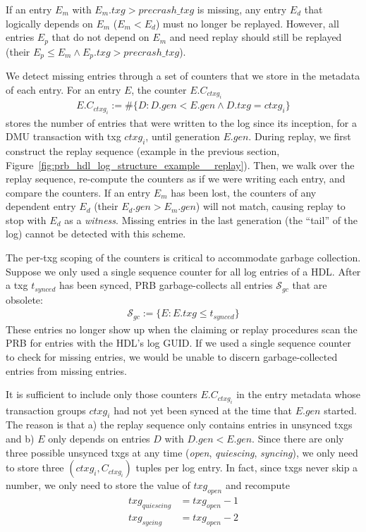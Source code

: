 \documentclass[12pt,a4paper,twoside]{book}
\begin{document}
If an entry $E_m$ with $E_m.txg > precrash\_txg$ is missing, any entry $E_d$ that logically depends on $E_m$ ($E_m < E_d$) must no longer be replayed.
However, all entries $E_p$ that do not depend on $E_m$ and need replay should still be replayed (their $E_p \le E_m \wedge E_p.txg > precrash\_txg$).

We detect missing entries through a set of counters that we store in the metadata of each entry.
For an entry $E$, the counter $E.C_{ctxg_i}$
\begin{gather*}
    E.C_{ctxg_i} := \#\{ D : D.gen < E.gen \wedge D.txg = ctxg_i\}
\end{gather*}
stores the number of entries that were written to the log since its inception, for a DMU transaction with txg $ctxg_i$, until generation $E.gen$.
During replay, we first construct the replay sequence (example in the previous section, Figure~\ref{fig:prb_hdl_log_structure_example__replay}).
Then, we walk over the replay sequence, re-compute the counters as if we were writing each entry, and compare the counters.
If an entry $E_m$ has been lost, the counters of any dependent entry $E_d$ (their $E_d.gen > E_m.gen$) will not match, causing replay to stop with $E_d$ as a \textit{witness}.
Missing entries in the last generation (the ``tail'' of the log) cannot be detected with this scheme.

The per-txg scoping of the counters is critical to accommodate garbage collection.
Suppose we only used a single sequence counter for all log entries of a HDL.
After a txg $t_{synced}$ has been synced, PRB garbage-collects all entries $\mathcal{S}_{gc}$ that are obsolete:
\begin{align*}
    \mathcal{S}_{gc} := \{ E : E.txg \le t_{synced}\}
\end{align*}
These entries no longer show up when the claiming or replay procedures scan the PRB for entries with the HDL's log GUID.
If we used a single sequence counter to check for missing entries, we would be unable to discern garbage-collected entries from missing entries.

It is sufficient to include only those counters $E.C_{ctxg_i}$ in the entry metadata whose transaction groups $ctxg_i$ had not yet been synced at the time that $E.gen$ started.
The reason is that a) the replay sequence only contains entries in unsynced txgs and b) $E$ only depends on entries $D$ with $D.gen < E.gen$.
Since there are only three possible unsynced txgs at any time (\textit{open}, \textit{quiescing}, \textit{syncing}), we only need to store three $(ctxg_i, C_{ctxg_i})$ tuples per log entry.
In fact, since txgs never skip a number, we only need to store the value of $txg_{open}$ and recompute
\begin{align*}
    txg_{quiescing} & = txg_{open} - 1 \\
    txg_{sycing} & = txg_{open} - 2
\end{align*}
\end{document}

